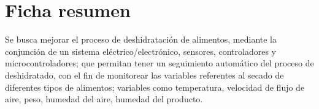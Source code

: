 \chapter*{Ficha resumen}
Se busca mejorar el proceso de deshidratación de alimentos, mediante la
conjunción de un sistema eléctrico/electrónico, sensores, controladores y
microcontroladores; que permitan tener un seguimiento automático del proceso de
deshidratado, con el fin de monitorear las variables referentes al secado de
diferentes tipos de alimentos; variables como temperatura, velocidad de flujo de
aire, peso, humedad del aire, humedad del producto.
\cleardoublepage
